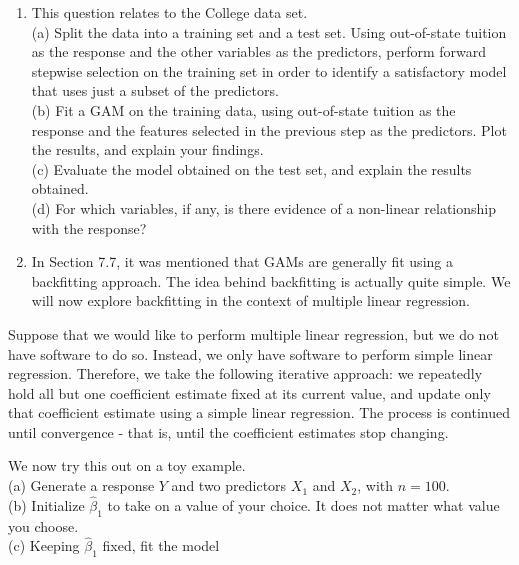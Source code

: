 \documentclass[10pt]{article}
\begin{document}
\begin{enumerate}
(e) Now fit a regression spline for a range of degrees of freedom, and plot the resulting fits and report the resulting RSS. Describe the results obtained.\\
(f) Perform cross-validation or another approach in order to select the best degrees of freedom for a regression spline on this data. Describe your results.
  \item This question relates to the College data set.\\
(a) Split the data into a training set and a test set. Using out-of-state tuition as the response and the other variables as the predictors, perform forward stepwise selection on the training set in order to identify a satisfactory model that uses just a subset of the predictors.\\
(b) Fit a GAM on the training data, using out-of-state tuition as the response and the features selected in the previous step as the predictors. Plot the results, and explain your findings.\\
(c) Evaluate the model obtained on the test set, and explain the results obtained.\\
(d) For which variables, if any, is there evidence of a non-linear relationship with the response?
  \item In Section 7.7, it was mentioned that GAMs are generally fit using a backfitting approach. The idea behind backfitting is actually quite simple. We will now explore backfitting in the context of multiple linear regression.
\end{enumerate}

Suppose that we would like to perform multiple linear regression, but we do not have software to do so. Instead, we only have software to perform simple linear regression. Therefore, we take the following iterative approach: we repeatedly hold all but one coefficient estimate fixed at its current value, and update only that coefficient estimate using a simple linear regression. The process is continued until convergence - that is, until the coefficient estimates stop changing.

We now try this out on a toy example.\\
(a) Generate a response $Y$ and two predictors $X_{1}$ and $X_{2}$, with $n=100$.\\
(b) Initialize $\hat{\beta}_{1}$ to take on a value of your choice. It does not matter what value you choose.\\
(c) Keeping $\hat{\beta}_{1}$ fixed, fit the model
\end{document}
